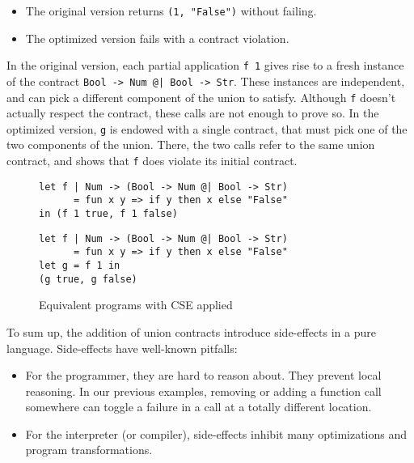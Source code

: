 \documentclass[sigplan,screen,10pt]{acmart}
\newcommand{\unsure}[2][1=]{}
\newcommand{\nickel}[1]{\lstinline[language=nickel]{#1}}
\begin{document}
\begin{itemize}
    \item The original version returns \nickel{(1, "False")} without failing.
    \item The optimized version fails with a contract violation.
\end{itemize}

In the original version, each partial application \nickel{f 1} gives rise to a
fresh instance of the contract \nickel{Bool -> Num @| Bool -> Str}. These
instances are independent, and can pick a different component of the union to
satisfy. Although \nickel{f} doesn't actually respect the contract, these calls
are not enough to prove so. In the optimized version, \nickel{g} is endowed with
a single contract, that must pick one of the two components of the union. There,
the two calls refer to the same union contract, and shows that \nickel{f} does
violate its initial contract.

\begin{figure}[h]
\begin{lstlisting}[language=nickel, title=Original]
let f | Num -> (Bool -> Num @| Bool -> Str)
      = fun x y => if y then x else "False"
in (f 1 true, f 1 false)
\end{lstlisting}
\begin{lstlisting}[language=nickel, title=Optimized]
let f | Num -> (Bool -> Num @| Bool -> Str)
      = fun x y => if y then x else "False"
let g = f 1 in
(g true, g false)
\end{lstlisting}
\caption{Equivalent programs with CSE applied}
\label{fig:optimized-programs}
\end{figure}

\unsure{These arguments should go in the purity section}
To sum up, the addition of union contracts introduce side-effects in a pure
language. Side-effects have well-known pitfalls:
\begin{itemize}
    \item For the programmer, they are hard to reason about. They prevent local
        reasoning. In our previous examples, removing or adding a function call
        somewhere can toggle a failure in a call at a totally different
        location.
    \item For the interpreter (or compiler), side-effects inhibit many optimizations and
        program transformations.
\end{itemize}
\end{document}
